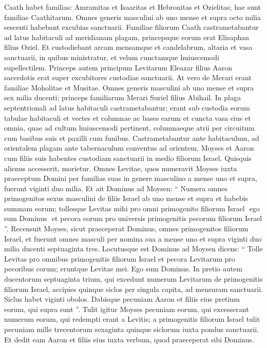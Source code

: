\begin{biblechapter}
\begin{biblechapter}
\begin{biblechapter}
 \verse Caath habet familias: Amramitas et Isaaritas et Hebronitas et Ozielitas; hae sunt familiae Caathitarum. 
\verse Omnes generis masculini ab uno mense et supra octo milia sescenti habebant excubias sanctuarii. 
\verse Familiae filiorum Caath castrametabantur ad latus habitaculi ad meridianam plagam, 
\verse princepsque eorum erat Elisaphan filius Oziel. 
\verse Et custodiebant arcam mensamque et candelabrum, altaria et vasa sanctuarii, in quibus ministratur, et velum cunctamque huiuscemodi supellectilem. 
\verse Princeps autem principum Levitarum Eleazar filius Aaron sacerdotis erat super excubitores custodiae sanctuarii.
 \verse At vero de Merari erant familiae Moholitae et Musitae. 
\verse Omnes generis masculini ab uno mense et supra sex milia ducenti; 
\verse princeps familiarum Merari Suriel filius Abihail. In plaga septentrionali ad latus habitaculi castrametabantur; 
\verse erant sub custodia eorum tabulae habitaculi et vectes et columnae ac bases earum et cuncta vasa eius et omnia, quae ad cultum huiuscemodi pertinent, 
\verse columnaeque atrii per circuitum cum basibus suis et paxilli cum funibus.
 \verse Castrametabantur ante habitaculum, ad orientalem plagam ante tabernaculum conventus ad orientem, Moyses et Aaron cum filiis suis habentes custodiam sanctuarii in medio filiorum Israel. Quisquis alienus accesserit, morietur.
 \verse Omnes Levitae, quos numeravit Moyses iuxta praeceptum Domini per familias suas in genere masculino a mense uno et supra, fuerunt viginti duo milia.
 \verse Et ait Dominus ad Moysen: “ Numera omnes primogenitos sexus masculini de filiis Israel ab uno mense et supra et habebis summam eorum; 
\verse tollesque Levitas mihi pro omni primogenito filiorum Israel ­ ego sum Dominus ­ et pecora eorum pro universis primogenitis pecorum filiorum Israel ”. 
\verse Recensuit Moyses, sicut praeceperat Dominus, omnes primogenitos filiorum Israel, 
\verse et fuerunt omnes masculi per nomina sua a mense uno et supra viginti duo milia ducenti septuaginta tres.
 \verse Locutusque est Dominus ad Moysen dicens: 
\verse “ Tolle Levitas pro omnibus primogenitis filiorum Israel et pecora Levitarum pro pecoribus corum; eruntque Levitae mei. Ego sum Dominus. 
\verse In pretio autem ducentorum septuaginta trium, qui excedunt numerum Levitarum de primogenitis filiorum Israel, 
\verse accipies quinque siclos per singula capita, ad mensuram sanctuarii. Siclus habet viginti obolos. 
\verse Dabisque pecuniam Aaron et filiis eius pretium eorum, qui supra sunt ”.
 \verse Tulit igitur Moyses pecuniam eorum, qui excesserant numerum eorum, qui redempti erant a Levitis; 
\verse a primogenitis filiorum Israel tulit pecuniam mille trecentorum sexaginta quinque siclorum iuxta pondus sanctuarii. 
\verse Et dedit eam Aaron et filiis eius iuxta verbum, quod praeceperat sibi Dominus.
 

\end{biblechapter}
\end{biblechapter}
\end{biblechapter}
